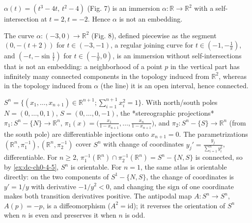 \begin{example}
  \label{ex:dc-ch0-3-4}


  $\alpha(t)=(t^3-4t,\,t^2-4)$ (Fig. 7) is an immersion
  $\alpha:\mathbb{R}\to\mathbb{R}^2$ with a self-intersection at $t=2,t=-2$. Hence
  $\alpha$ is not an embedding.
\end{example}

\begin{example}
  \label{ex:dc-ch0-3-5}

  The curve $\alpha:(-3,0)\to\mathbb{R}^2$ (Fig. 8), defined piecewise as the
  segment $(0,-(t+2))$ for $t\in(-3,-1)$, a regular joining curve for
  $t\in(-1,-\frac1\pi)$, and $(-t,-\sin\frac1t)$ for $t\in(-\frac1\pi,0)$, is an
  immersion without self-intersections that is not an embedding: a neighborhood of
  a point $p$ in the vertical part has infinitely many connected components in the
  topology induced from $\mathbb{R}^2$, whereas in the topology induced from
  $\alpha$ (the line) it is an open interval, hence connected.
\end{example}

\begin{example}
  \label{ex:dc-ch0-4-6}

  $S^n=\{(x_1,\dots,x_{n+1})\in\mathbb{R}^{n+1};\sum_{i=1}^{n+1}x_i^2=1\}$. With
  north/south poles $N=(0,\dots,0,1)$, $S=(0,\dots,0,-1)$, the *stereographic
  projections* $\pi_1:S^n-\{N\}\to\mathbb{R}^n$,
  $\pi_1(x)=\big(\frac{x_1}{1-x_{n+1}},\dots,\frac{x_n}{1-x_{n+1}}\big)$, and
  $\pi_2:S^n-\{S\}\to\mathbb{R}^n$ (from the south pole) are differentiable
  injections onto $x_{n+1}=0$. The parametrizations
  $(\mathbb{R}^n,\pi_1^{-1}),(\mathbb{R}^n,\pi_2^{-1})$ cover $S^n$ with change of
  coordinates $y_j'=\frac{y_j}{\sum_{i=1}^n y_i^2}$, differentiable. For $n\geq2$,
  $\pi_1^{-1}(\mathbb{R}^n)\cap\pi_2^{-1}(\mathbb{R}^n)=S^n-\{N,S\}$ is connected,
  so by \cref{ex:dc-ch0-4-5}, $S^n$ is orientable. For $n=1$, the same atlas is
  orientable directly: on the two components of $S^1-\{N,S\}$, the change of
  coordinates is $y'=1/y$ with derivative $-1/y^2<0$, and changing the sign of one
  coordinate makes both transition derivatives positive. The antipodal map
  $A:S^n\to S^n$, $A(p)=-p$, is a diffeomorphism ($A^2=\mathrm{id}$); it reverses the
  orientation of $S^n$ when $n$ is even and preserves it when $n$ is odd.
\end{example}

